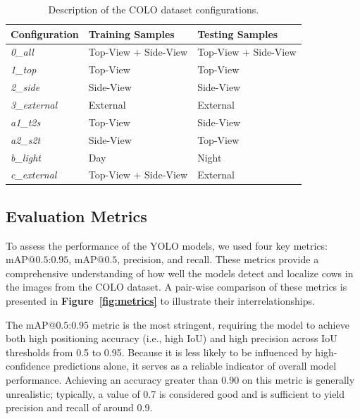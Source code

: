 \begin{table}[h]
    \caption{Description of the COLO dataset configurations.}
    \centering
    \begin{tabular}{lll}
        \toprule
        \textbf{Configuration} & \textbf{Training Samples} & \textbf{Testing Samples} \\
        \midrule
        \textit{0\_all} & Top-View + Side-View & Top-View + Side-View \\ [0.5ex]
        \textit{1\_top} & Top-View & Top-View \\[0.5ex]
        \textit{2\_side} & Side-View & Side-View \\[0.5ex]
        \textit{3\_external} & External & External \\[0.5ex]
        \midrule
        \textit{a1\_t2s} & Top-View & Side-View \\[0.5ex]
        \textit{a2\_s2t} & Side-View & Top-View \\[0.5ex]
        \textit{b\_light} & Day & Night \\[0.5ex]
        \textit{c\_external} & Top-View + Side-View & External \\[0.5ex]
        \bottomrule
    \end{tabular}
    \label{tab:colo_config}
\end{table}

\subsection*{Evaluation Metrics}

To assess the performance of the YOLO models, we used four key metrics: $\text{mAP@{0.5:0.95}}$, $\text{mAP@{0.5}}$, precision, and recall. These metrics provide a comprehensive understanding of how well the models detect and localize cows in the images from the COLO dataset. A pair-wise comparison of these metrics is presented in \textbf{Figure~\ref{fig:metrics}} to illustrate their interrelationships.

The $\text{mAP@{0.5:0.95}}$ metric is the most stringent, requiring the model to achieve both high positioning accuracy (i.e., high IoU) and high precision across IoU thresholds from 0.5 to 0.95. Because it is less likely to be influenced by high-confidence predictions alone, it serves as a reliable indicator of overall model performance. Achieving an accuracy greater than 0.90 on this metric is generally unrealistic; typically, a value of 0.7 is considered good and is sufficient to yield precision and recall of around 0.9.

